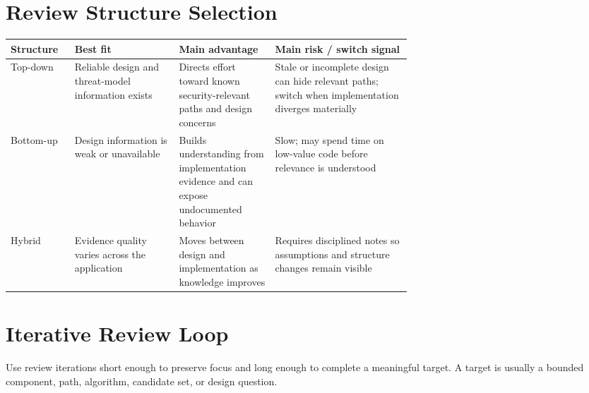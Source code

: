 \documentclass[10pt]{article}
\newcommand{\fieldline}[1]{\textbf{#1}\hspace{0.5em}\leaders\hbox{\rule[0.4ex]{0.6em}{0.35pt}\hspace{0.25em}}\hfill\kern0pt}
\begin{document}
\section{Review Structure Selection}
\par\smallskip\noindent\begin{tabularx}{\linewidth}{@{}L{0.16\linewidth}L{0.26\linewidth}L{0.24\linewidth}Y@{}}
\toprule
Structure & Best fit & Main advantage & Main risk / switch signal \\
\midrule
Top-down & Reliable design and threat-model information exists & Directs effort toward known security-relevant paths and design concerns & Stale or incomplete design can hide relevant paths; switch when implementation diverges materially \\
\addlinespace
Bottom-up & Design information is weak or unavailable & Builds understanding from implementation evidence and can expose undocumented behavior & Slow; may spend time on low-value code before relevance is understood \\
\addlinespace
Hybrid & Evidence quality varies across the application & Moves between design and implementation as knowledge improves & Requires disciplined notes so assumptions and structure changes remain visible \\
\bottomrule
\end{tabularx}

\clearpage

\section{Iterative Review Loop}
Use review iterations short enough to preserve focus and long enough to complete a meaningful target. A target is usually a bounded component, path, algorithm, candidate set, or design question.
\end{document}
